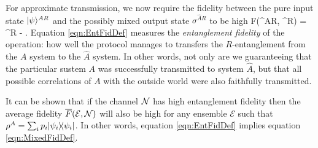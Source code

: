 \documentclass[aps,11pt,twoside,letterpaper]{article}
\def\E{\mathcal{E}}
\begin{document}
			
			For approximate transmission, we now require the fidelity between the pure input state $| \psi \rangle^{AR}$ 
			and the possibly mixed output state $\sigma^{\widehat{A}R}$ to be high
			\be	\label{eqn:EntFidDef}
				F(\ket{\psi}^{AR}, \sigma^{R}) 
					= 		 \sigma^{R} 
					 - \epsilon.
			\ee
			Equation \eqref{eqn:EntFidDef} measures the \emph{entanglement fidelity} of the operation: 
			how well the protocol manages to transfers the $R$-entanglement from the $A$ system to the $\widehat{A}$
			system. 
            In other words, not only are we guaranteeing that the particular sustem $A$ was successfully 
            transmitted to system $\widehat{A}$, but that all possible correlations of $A$ with the outside
            world were also faithfully transmitted.

			It can be shown \cite{EntFid} that if the channel ${\cal N}$ has high entanglement fidelity then the 
			average fidelity  $\bar{F}(\E, \cN)$ will also be high for any ensemble $\E$ such that 
			$\rho^A=\sum_i p_i | \psi_i \rangle\!\langle \psi_i |$.
			In other words, equation \eqref{eqn:EntFidDef} implies equation \eqref{eqn:MixedFidDef}.

					
\end{document}
